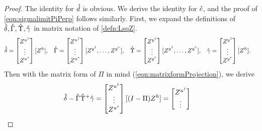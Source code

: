 \documentclass[main.tex]{subfiles}
\begin{document}
  \begin{proof}
    The identity for $\mathring {d}$ is obvious.
    We derive the identity for $\mathring {e}$, and the proof of \cref{eqn:sigmalimitPiPerp} follows similarly.
    First, we expand the definitions of $\mathring {\delta}, \mathring\Gamma, \mathring{\Upsilon}, \mathring{\gamma}$ in matrix notation of \cref{defn:LsqZ}.
    \begin{align*}
      \mathring {\delta} &= \begin{bmatrix}
              Z^{u^1}\\
            \vdots\\
              Z^{u^s}
          \end{bmatrix}
          [Z^h]
          ,&
      \mathring \Gamma &=
          \begin{bmatrix}
              Z^{u^1}\\
            \vdots\\
              Z^{u^s}
          \end{bmatrix}
          [Z^{y^1}, \ldots, Z^{y^r}]
          ,&
      \mathring {\Upsilon} &=
        \begin{bmatrix}
            Z^{y^1}\\
          \vdots\\
            Z^{y^r}
        \end{bmatrix}
        [Z^{y^1}, \ldots, Z^{y^r}]
        ,&
      \mathring {\gamma} &=
        \begin{bmatrix}
            Z^{y^1}\\
          \vdots\\
            Z^{y^r}
        \end{bmatrix}
        [Z^h]
        .
    \end{align*}
    Then with the matrix form of $\Pi$ in mind (\cref{eqn:matrixformProjection}), we derive
    \begin{align}
    \mathring{\delta} - \mathring \Gamma \mathring{\Upsilon }^+ \mathring{\gamma}
      &=
        \begin{bmatrix}
           Z^{u^1}\\
          \vdots\\
           Z^{u^s}
        \end{bmatrix}
        [(I - \Pi)  Z^{h}]
      =
        \begin{bmatrix}
           Z^{u^1}\\
          \vdots\\

\end{bmatrix}
\end{align}
\end{proof}
\end{document}
